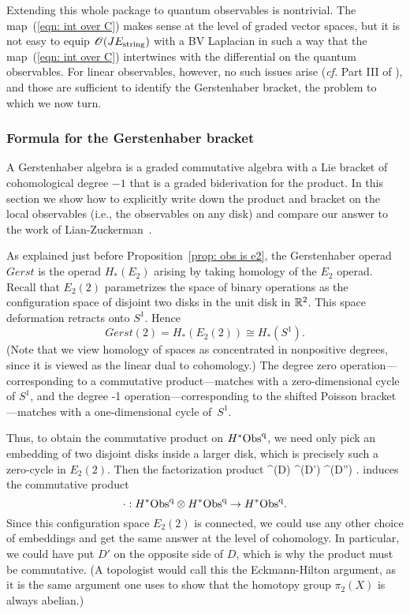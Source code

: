 Extending this whole package to quantum observables is nontrivial. 
The map~(\ref{eqn: int over C}) makes sense at the level of graded vector spaces,
but it is not easy to equip $\mathscr O(J E_{\rm string})$ with a BV Laplacian 
in such a way that the map~(\ref{eqn: int over C}) intertwines with the differential on the quantum observables.
For linear observables, however, no such issues arise
({\em cf.} Part III of \cite{GGW}), 
and those are sufficient to identify the Gerstenhaber bracket,
the problem to which we now turn.

\subsubsection{Formula for the Gerstenhaber bracket}
\label{sec: gerstenhaber}

A Gerstenhaber algebra is a graded commutative algebra with a Lie bracket of cohomological degree $-1$ that is a graded biderivation for the product. 
In this section we show how to explicitly write down the product and bracket on the local observables (i.e., the observables on any disk) and compare our answer to the work of Lian-Zuckerman~\cite{LZ1}.

As explained just before Proposition~\ref{prop: obs is e2}, 
the Gerstenhaber operad $Gerst$ is the operad $H_*(E_2)$ arising by taking homology of the $E_2$ operad.
Recall that $E_2(2)$ parametrizes the space of binary operations as the configuration space of disjoint two disks in the unit disk in $\mathbb R^2$.
This space deformation retracts onto $S^1$.
Hence 
\[
Gerst(2) = H_*(E_2(2)) \cong H_*(S^1). 
\]
(Note that we view homology of spaces as concentrated in nonpositive degrees,
since it is viewed as the linear dual to cohomology.)
The degree zero operation---corresponding to a commutative product---matches with a zero-dimensional cycle of $S^1$,
and the degree -1 operation---corresponding to the shifted Poisson bracket---matches with a one-dimensional cycle of~$S^1$. 

Thus, to obtain the commutative product on $H^*{\rm Obs}^{\rm q}$, 
we need only pick an embedding of two disjoint disks inside a larger disk,
which is precisely such a zero-cycle in $E_2(2)$.
Then the factorization product
\ben
\Obs^\q(D) \tensor \Obs^\q(D') \to \Obs^\q(D'') .
\een 
induces the commutative product
\[
\cdot: H^*{\rm Obs}^{\rm q} \otimes H^*{\rm Obs}^{\rm q} \to H^*{\rm Obs}^{\rm q}.
\]
Since this configuration space $E_2(2)$ is connected, 
we could use any other choice of embeddings and get the same answer at the level of cohomology.
In particular, we could have put $D'$ on the opposite side of $D$,
which is why the product must be commutative.
(A topologist would call this the Eckmann-Hilton argument,
as it is the same argument one uses to show that the homotopy group $\pi_2(X)$ is always abelian.)

